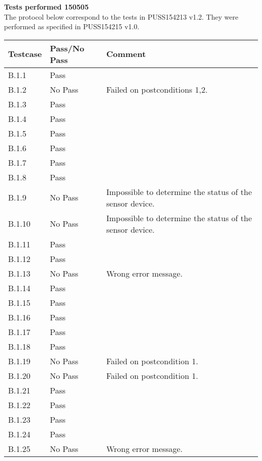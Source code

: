 \renewcommand{\testdate}{150505}
\textbf{ Tests performed \testdate} \\
The protocol below correspond to the tests in PUSS154213 v1.2. They were performed as specified in PUSS154215 v1.0.
\begin{center}
  		\begin{tabular}{| p{3cm} | p{5cm} | p{5cm} |}
    		\hline
	    	\textbf{Testcase}			& \textbf{Pass/No Pass} 	& \textbf{Comment} \\ \hline
    		B.1.1		 						& Pass 										&  				\\ \hline
    		B.1.2		 						& No Pass 										& Failed on postconditions 1,2. 				 \\	\hline
    		B.1.3		 						& Pass 										& 				 \\	\hline
    		B.1.4		 						& Pass 										& 				 \\	\hline
    		B.1.5		 						& Pass 										& 				 \\	\hline
    		B.1.6		 						& Pass 										& 				 \\	\hline
    		B.1.7		 						& Pass 										& 				 \\	\hline
    		B.1.8		 						& Pass 										& 				 \\	\hline
    		B.1.9		 						& No Pass 										& Impossible to determine the status of the sensor device. 				 \\	\hline
    		B.1.10	 							& No Pass 										& Impossible to determine the status of the sensor device.				 \\	\hline
    		B.1.11	 							& Pass 										& 				 \\	\hline
    		B.1.12	 							& Pass 										& 				 \\	\hline
    		B.1.13	 							& No Pass 										& Wrong error message.				 \\	\hline
    		B.1.14	 							& Pass 										& 				 \\	\hline
    		B.1.15	 							& Pass 										& 				 \\	\hline
    		B.1.16	 							& Pass 										& 				 \\	\hline
    		B.1.17	 							& Pass 										& 				 \\	\hline
    		B.1.18	 							& Pass 										& 				 \\	\hline
    		B.1.19	 							& No Pass 										& Failed on postcondition 1. 				 \\	\hline
    		B.1.20	 							& No Pass 										& Failed on postcondition 1.				 \\	\hline
    		B.1.21	 							& Pass 										& 				 \\	\hline
    		B.1.22	 							& Pass 										& 				 \\	\hline
    		B.1.23	 							& Pass 										& 				 \\	\hline
    		B.1.24	 							& Pass 										& 				 \\	\hline
    		B.1.25	 							& No Pass 										& Wrong error message.				 \\	\hline
 		 \end{tabular}
	\end{center}
